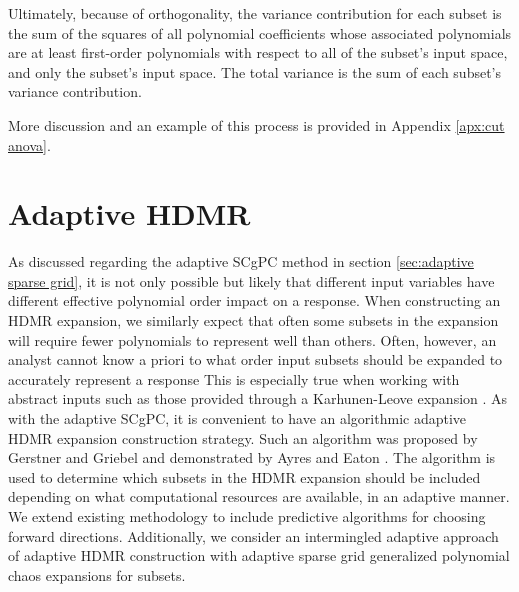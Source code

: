 Ultimately, because of orthogonality, the variance contribution for each subset is the sum of the squares of all polynomial
coefficients whose associated polynomials are at least first-order polynomials with respect to all of the
subset's input space, and only the subset's input space.  The total variance is the sum of each subset's
variance contribution.

More discussion and an example of this process is provided in Appendix \ref{apx:cut anova}.

\section{Adaptive HDMR}
As discussed regarding the adaptive SCgPC method in section
\ref{sec:adaptive sparse grid}, it is not only possible but likely that different input variables have
different effective polynomial order impact on a response.  When constructing an HDMR expansion, we similarly
expect that often some subsets in the expansion will require fewer polynomials to represent well than others.
Often, however, an analyst
cannot know a priori to what order input subsets should be expanded to accurately represent a response
This is especially true when working with
abstract inputs such as those provided through a Karhunen-Leove expansion \cite{karhunen}.  As
with the adaptive SCgPC, it is convenient to have an
algorithmic adaptive HDMR expansion construction strategy.  Such an algorithm was proposed by Gerstner and Griebel
\cite{Gerstner} and demonstrated by Ayres and Eaton \cite{Ayres}.  The algorithm is used to determine which
subsets in the HDMR expansion should be included depending on what computational resources are available, in
an adaptive manner.  
We extend existing methodology to include
predictive algorithms for choosing forward directions.  Additionally, we consider an intermingled adaptive
approach of adaptive HDMR construction with adaptive sparse grid generalized polynomial chaos expansions for
subsets.  

